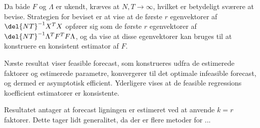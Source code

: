Da både \(F\) og \(\Lambda\) er ukendt, kræves at \(N, T \rightarrow \infty\), hvilket er betydeligt sværere at bevise.
Strategien for beviset er at vise at de første \(r\) egenvektorer af \(\del{NT}^{-1} X^T X\) opfører sig som de første \(r\) egenvektorer af \(\del{NT}^{-1} \Lambda^T F^T F \Lambda\), og da vise at disse egenvektorer kan bruges til at konstruere en konsistent estimator af \(F\).

Næste resultat viser feasible forecast, som konstrueres udfra de estimerede faktorer og estimerede parametre, konvergerer til det optimale infeasible forecast, og dermed er asymptotisk efficient.
Yderligere vises at de feasible regressions koefficient estimatorer er konsistente.

Resultatet antager at forecast ligningen er estimeret ved at anvende \(k=r\) faktorer.
Dette tager lidt generalitet, da der er flere metoder for ...

